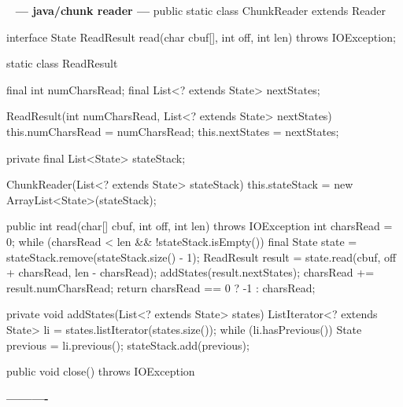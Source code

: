 \documentclass{book}
\newenvironment{chunk}[1]{%
{\ }\newline\noindent%
\hbox{\hskip 2.0cm}{\bf --- #1 ---}%
\verbatim}%                               say exactly what we see
{\endverbatim%
\par{}%
\noindent{}%
\hbox{\hskip 2.0cm}{\bf ----------}%
\par%
\normalsize\noindent}%
\begin{document}
\begin{chunk}{java/chunk reader}
public static class ChunkReader extends Reader {
    interface State {
        ReadResult read(char cbuf[], int off, int len) throws IOException;
    }

    static class ReadResult {
        final int numCharsRead;
        final List<? extends State> nextStates;

        ReadResult(int numCharsRead, List<? extends State> nextStates) {
            this.numCharsRead = numCharsRead;
            this.nextStates = nextStates;
        }
    }

    private final List<State> stateStack;

    ChunkReader(List<? extends State> stateStack) {
        this.stateStack = new ArrayList<State>(stateStack);
    }

    public int read(char[] cbuf, int off, int len) throws IOException {
        int charsRead = 0;
        while (charsRead < len && !stateStack.isEmpty()) {
            final State state = stateStack.remove(stateStack.size() - 1);
            ReadResult result = state.read(cbuf, off + charsRead, len - charsRead);
            addStates(result.nextStates);
            charsRead += result.numCharsRead;
        }
        return charsRead == 0 ? -1 : charsRead;
    }

    private void addStates(List<? extends State> states) {
        ListIterator<? extends State> li = states.listIterator(states.size());
        while (li.hasPrevious()) {
            State previous = li.previous();
            stateStack.add(previous);
        }
    }

    public void close() throws IOException {
    }
}
\end{chunk}
\end{document}
